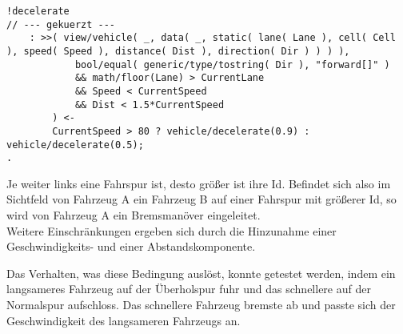 \begin{minipage}[hptb]{0.95\textwidth}
\begin{lstlisting}[style=asl, 
                   keywords={Lane,CurrentLane}, 
                   keywords={[2]}, 
                   keywords={[3]}, 
                   caption={Auszug aus Agentenscript: Überholverbot rechts},
                   label={lst:multilane-rechts}]      
!decelerate
// --- gekuerzt ---
    : >>( view/vehicle( _, data( _, static( lane( Lane ), cell( Cell ), speed( Speed ), distance( Dist ), direction( Dir ) ) ) ), 
            bool/equal( generic/type/tostring( Dir ), "forward[]" ) 
            && math/floor(Lane) > CurrentLane
            && Speed < CurrentSpeed
            && Dist < 1.5*CurrentSpeed
        ) <-
        CurrentSpeed > 80 ? vehicle/decelerate(0.9) : vehicle/decelerate(0.5);
.\end{lstlisting}
\end{minipage}

Je weiter links eine Fahrspur ist, desto größer ist ihre Id.
Befindet sich also im Sichtfeld von Fahrzeug A ein Fahrzeug B auf einer Fahrspur mit größerer Id, so wird von Fahrzeug A ein Bremsmanöver eingeleitet.
\\
Weitere Einschränkungen ergeben sich durch die Hinzunahme einer Geschwindigkeits- und einer Abstandskomponente.

Das Verhalten, was diese Bedingung auslöst, konnte getestet werden, indem ein langsameres Fahrzeug auf der Überholspur fuhr und das schnellere auf der Normalspur aufschloss.
Das schnellere Fahrzeug bremste ab und passte sich der Geschwindigkeit des langsameren Fahrzeugs an.
